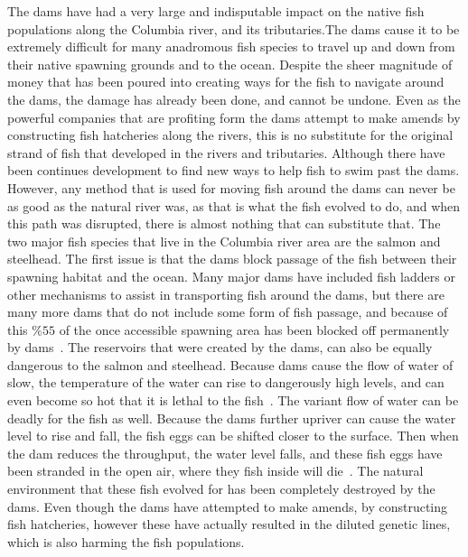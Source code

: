 \documentclass[12pt,twoside]{article}
\begin{document}
The dams have had a very large and indisputable impact on the native fish populations along the Columbia river, and its tributaries.The dams cause it to be extremely difficult for many anadromous fish species to travel up and down from their native spawning grounds and to the ocean. Despite the sheer magnitude of money that has been poured into creating ways for the fish to navigate around the dams, the damage has already been done, and cannot be undone. Even as the powerful companies that are profiting form the dams attempt to make amends by constructing fish hatcheries along the rivers, this is no substitute for the original strand of fish that developed in the rivers and tributaries. Although there have been continues development to find new ways to help fish to swim past the dams. However, any method that is used for moving fish around the dams can never be as good as the natural river was, as that is what the fish evolved to do, and when this path was disrupted, there is almost nothing that can substitute that. The two major fish species that live in the Columbia river area are the salmon and steelhead. The first issue is that the dams block passage of the fish between their spawning habitat and the ocean. Many major dams have included fish ladders or other mechanisms to assist in transporting fish around the dams, but there are many more dams that do not include some form of fish passage, and because of this $\%55$ of the once accessible spawning area has been blocked off permanently by dams~\cite{SS}. The reservoirs that were created by the dams, can also be equally dangerous to the salmon and steelhead. Because dams cause the flow of water of slow, the temperature of the water can rise to dangerously high levels, and can even become so hot that it is lethal to the fish~\cite{SS}. The variant flow of water can be deadly for the fish as well. Because the dams further upriver can cause the water level to rise and fall, the fish eggs can be shifted closer to the surface. Then when the dam reduces the throughput, the water level falls, and these fish eggs have been stranded in the open air, where they fish inside will die~\cite{SS}. The natural environment that these fish evolved for has been completely destroyed by the dams. Even though the dams have attempted to make amends, by constructing fish hatcheries, however these have actually resulted in the diluted genetic lines, which is also harming the fish populations.
\par
\end{document}

